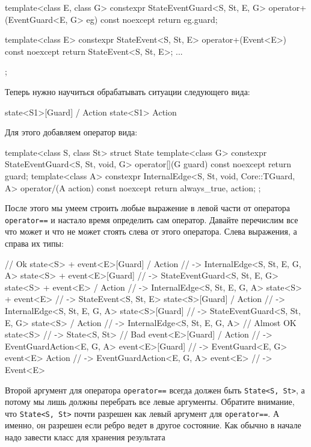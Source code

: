 \documentclass{article}
\begin{document}
{\begin{cppcode}[\nonumbers]
{  template<class E, class G>
  constexpr StateEventGuard<S, St, E, G>
  operator+(EventGuard<E, G> eg) const noexcept {
    return {eg.guard};
  }

  template<class E>
  constexpr StateEvent<S, St, E> operator+(Event<E>) const noexcept {
    return StateEvent<S, St, E>{};
  }
  ...
};
\end{cppcode}
Теперь нужно научиться обрабатывать ситуации следующего вида:
\begin{cppcode}
state<S1>[Guard] / Action
state<S1> Action
\end{cppcode}
Для этого добавляем оператор вида:
\begin{cppcode}[\nonumbers]
template<class S, class St>
struct State {
  template<class G>
  constexpr StateEventGuard<S, St, void, G> operator[](G guard) const noexcept {
    return {guard};
  }
  template<class A>
  constexpr InternalEdge<S, St, void, Core::TGuard, A>
  operator/(A action) const noexcept {
    return {always_true, action};
  }
};
\end{cppcode}
После этого мы умеем строить любые выражение в левой части от оператора \verb"operator==" и настало время определить сам оператор.
Давайте перечислим все что может и что не может стоять слева от этого оператора.
Слева выражения, а справа их типы:
\begin{cppcode}[\nonumbers]
// Ok
state<S> + event<E>[Guard] / Action // -> InternalEdge<S, St, E, G, A>
state<S> + event<E>[Guard]          // -> StateEventGuard<S, St, E, G>
state<S> + event<E> / Action        // -> InternalEdge<S, St, E, G, A>
state<S> + event<E>                 // -> StateEvent<S, St, E>
state<S>[Guard] / Action            // -> InternalEdge<S, St, E, G, A> 
state<S>[Guard]                     // -> StateEventGuard<S, St, E, G>
state<S> / Action                   // -> InternalEdge<S, St, E, G, A> 
// Almost OK
state<S>                            // -> State<S, St>
// Bad
event<E>[Guard] / Action            // -> EventGuardAction<E, G, A>
event<E>[Guard]                     // -> EventGuard<E, G>
event<E> Action                     // -> EventGuardAction<E, G, A>
event<E>                            // -> Event<E>
\end{cppcode}
Второй аргумент для оператора \verb"operator==" всегда должен быть \verb"State<S, St>", а потому мы лишь должны перебрать все левые аргументы.
Обратите внимание, что \verb"State<S, St>" почти разрешен как левый аргумент для \verb"operator==".
А именно, он разрешен если ребро ведет в другое состояние.
Как обычно в начале надо завести класс для хранения результата
}
\end{document}
